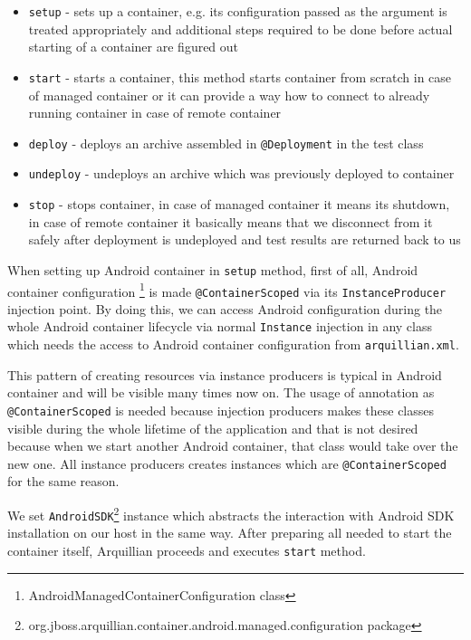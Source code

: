 \documentclass[12pt,final,oneside]{fithesis}
\begin{document}
\begin{itemize}
	\item{\texttt{setup} - sets up a container, e.g. its configuration passed as the argument is treated appropriately and additional steps required to be done before actual starting of a container are figured out}
	\item{\texttt{start} - starts a container, this method starts container from scratch in case of managed container or it can provide a way how to connect to already running container in case of remote container}
	\item{\texttt{deploy} - deploys an archive assembled in \texttt{@Deployment} in the test class}
	\item{\texttt{undeploy} - undeploys an archive which was previously deployed to container}
	\item{\texttt{stop} - stops container, in case of managed container it means its shutdown, in case of remote container it basically means that we disconnect from it safely after deployment is undeployed and test results are returned back to us}
\end{itemize}

When setting up Android container in \texttt{setup} method, first of all, Android container configuration \footnote{AndroidManagedContainerConfiguration class} is made \texttt{@ContainerScoped} via its \texttt{InstanceProducer} injection point. By doing this, we can access Android configuration during the whole Android container lifecycle via normal \texttt{Instance} injection in any class which needs the access to Android container configuration from \texttt{arquillian.xml}.

This pattern of creating resources via instance producers is typical in Android container and will be visible many times now on. The usage of annotation as \texttt{@ContainerScoped} is needed because injection producers makes these classes visible during the whole lifetime of the application and that is not desired because when we start another Android container, that class would take over the new one. All instance producers creates instances which are \texttt{@ContainerScoped} for the same reason.

We set \texttt{AndroidSDK}\footnote{org.jboss.arquillian.container.android.managed.configuration package} instance which abstracts the interaction with Android SDK installation on our host in the same way. After preparing all needed to start the container itself, Arquillian proceeds and executes \texttt{start} method.
\end{document}

